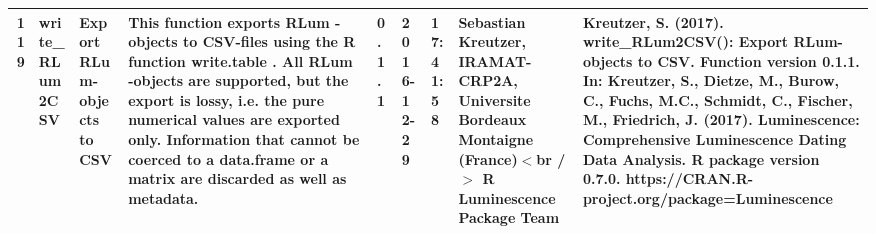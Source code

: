 \begin{table}[ht]
\begin{tabular}{rllllllll}
 \\ 
  119 & write\_RLum2CSV & Export RLum-objects to CSV & This function exports  RLum -objects to CSV-files using the R function write.table . All  RLum -objects are supported, but the export is lossy, i.e. the pure numerical values are exported only. Information that cannot be coerced to a  data.frame  or a  matrix  are discarded as well as metadata. & 0.1.1 & 2016-12-29 & 17:41:58
 & Sebastian Kreutzer, IRAMAT-CRP2A, Universite Bordeaux Montaigne (France)$<$br /$>$  R Luminescence Package Team & Kreutzer, S. (2017). write\_RLum2CSV(): Export RLum-objects to CSV. Function version 0.1.1. In: Kreutzer, S., Dietze, M., Burow, C., Fuchs, M.C., Schmidt, C., Fischer, M., Friedrich, J. (2017). Luminescence: Comprehensive Luminescence Dating Data Analysis. R package version 0.7.0. https://CRAN.R-project.org/package=Luminescence
 \\ 
   \hline
\end{tabular}
\end{table}

